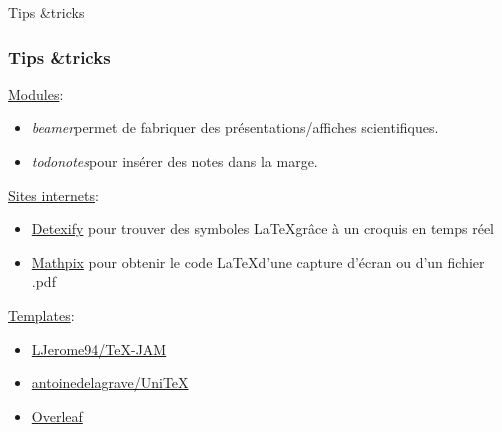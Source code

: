 

\begin{frame}
    \vfill
    \begin{center}
        \large
        Tips \&\;tricks
    \end{center}
    \vfill
\end{frame}

\begin{frame}
    \frametitle{ Tips \&\;tricks}
    \underline{Modules}:
    \begin{itemize}
        \item[$\diamond$] \textcolor{vibrant_green}{\textit{beamer}}\footnotemark permet de fabriquer des présentations/affiches scientifiques.
        \item[$\diamond$] \textcolor{vibrant_green}{\textit{todonotes}}\footnotemark pour insérer des notes dans la marge.
    \end{itemize}
    \vfill
    \pause
    \underline{Sites internets}:
    \begin{itemize}
        \item[$\diamond$] \href{https://detexify.kirelabs.org/classify.html}{\textcolor{lila_links}{Detexify}} pour trouver des symboles \LaTeX\;grâce à un croquis en temps réel
        \item[$\diamond$] \href{https://mathpix.com/}{\textcolor{lila_links}{Mathpix}} pour obtenir le code \LaTeX\;d'une capture d'écran ou d'un fichier .pdf
    \end{itemize}
    \vfill
    \pause
    \underline{Templates}:
    \begin{itemize}
        \item[$\diamond$] \href{https://github.com/LJerome94/TeX-JAM/tree/main}{\textcolor{lila_links}{LJerome94/TeX-JAM}}
        \item[$\diamond$] \href{https://github.com/antoinedelagrave/UniTeX}{\textcolor{lila_links}{antoinedelagrave/UniTeX}}
        \item[$\diamond$] \href{https://www.overleaf.com/latex/templates}{\textcolor{lila_links}{Overleaf}}
    \end{itemize}
\end{frame}
